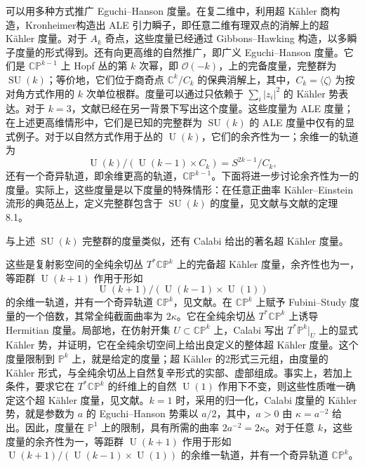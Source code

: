 \begin{example}
可以用多种方式推广 Eguchi--Hanson 度量。在复二维中，利用超 Kähler 商构造，Kronheimer构造出 ALE 引力瞬子，即任意二维有理双点的消解上的超 Kähler 度量。对于 $A_k$ 奇点，这些度量已经通过 Gibbons--Hawking 构造，以多瞬子度量的形式得到。还有向更高维的自然推广，即广义 Eguchi--Hanson 度量。它们是 $\mathbb{CP}^{k-1}$ 上 Hopf 丛的第 $k$ 次幂，即 $\mathcal O(-k)$，上的完备度量，完整群为 $\operatorname{SU}(k)$；等价地，它们位于商奇点 $\mathbb C^k/C_k$ 的保典消解上，其中，$C_k=\langle\zeta\rangle$ 为按对角方式作用的 $k$ 次单位根群。度量可以通过只依赖于 $\sum_i|z_i|^2$ 的 Kähler 势表达。对于 $k=3$，文献已经在另一背景下写出这个度量。这些度量为 ALE 度量；在上述更高维情形中，它们是已知的完整群为 $\operatorname{SU}(k)$ 的 ALE 度量中仅有的显式例子。对于以自然方式作用于丛的 $\operatorname{U}(k)$，它们的余齐性为一；余维一的轨道为
\[
\operatorname{U}(k)/(\operatorname{U}(k-1)\times C_k)=S^{2k-1}/C_k,
\]
还有一个奇异轨道，即余维更高的轨道，$\mathbb{CP}^{k-1}$。下面将进一步讨论余齐性为一的度量。实际上，这些度量是以下度量的特殊情形：在任意正曲率 Kähler--Einstein 流形的典范丛上，定义完整群包含于 $\operatorname{SU}(k)$ 的度量，见文献与文献的定理8.1。
\end{example}

与上述 $\operatorname{SU}(k)$ 完整群的度量类似，还有 Calabi 给出的著名超 Kähler 度量。

\begin{example}\label{ex:7.2}
这些是复射影空间的全纯余切丛 $T^*\mathbb{CP}^k$ 上的完备超 Kähler 度量，余齐性也为一，等距群 $\operatorname{U}(k+1)$ 作用于形如
\[
\operatorname{U}(k+1)/(\operatorname{U}(k-1)\times\operatorname{U}(1))
\]
的余维一轨道，并有一个奇异轨道 $\mathbb{CP}^k$，见文献。在 $\mathbb{CP}^k$ 上赋予 Fubini--Study 度量的一个倍数，其常全纯截面曲率为 $2\kappa$。它在全纯余切丛 $T^*\mathbb{CP}^k$ 上诱导 Hermitian 度量。局部地，在仿射开集 $U\subset\mathbb{CP}^k$ 上，Calabi 写出 $T^*\mathbb P^k|_U$ 上的显式 Kähler 势，并证明，它在全纯余切空间上给出良定义的整体超 Kähler 度量。这个度量限制到 $\mathbb P^k$ 上，就是给定的度量；超 Kähler 的2形式三元组，由度量的 Kähler 形式，与全纯余切丛上自然复辛形式的实部、虚部组成。事实上，若加上条件，要求它在 $T^*\mathbb{CP}^k$ 的纤维上的自然 $\operatorname{U}(1)$ 作用下不变，则这些性质唯一确定这个超 Kähler 度量，见文献。$k=1$ 时，采用的归一化，Calabi 度量的 Kähler 势，就是参数为 $a$ 的 Eguchi--Hanson 势乘以 $a/2$，其中，$a>0$ 由 $\kappa=a^{-2}$ 给出。因此，度量在 $\mathbb P^1$ 上的限制，具有所需的曲率 $2a^{-2}=2\kappa$。对于任意 $k$，这些度量的余齐性为一，等距群 $\operatorname{U}(k+1)$ 作用于形如 $\operatorname{U}(k+1)/(\operatorname{U}(k-1)\times\operatorname{U}(1))$ 的余维一轨道，并有一个奇异轨道 $\mathbb{CP}^k$。
\end{example}

